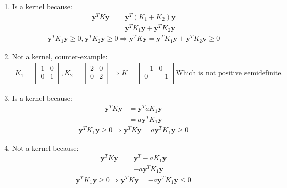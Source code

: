 \begin{answer}
\begin{enumerate}
\item 
Is a kernel because:
\begin{align*}
\textbf{y}^TK\textbf{y}&=\textbf{y}^T(K_1+K_2)\textbf{y}\\
&=\textbf{y}^TK_1\textbf{y}+\textbf{y}^TK_2\textbf{y}
\end{align*}
\begin{align*}
\textbf{y}^TK_1\textbf{y}\geq0,\textbf{y}^TK_2\textbf{y}\geq0\Rightarrow \textbf{y}^TK\textbf{y}=\textbf{y}^TK_1\textbf{y}+\textbf{y}^TK_2\textbf{y}\geq0
\end{align*}
\item 
Not a kernel, counter-example:
\begin{align*}
K_1=
   \begin{bmatrix} 
   1&0\\ 
   0&1\\ 
   \end{bmatrix},
K_2=
   \begin{bmatrix} 
   2&0\\ 
   0&2\\ 
   \end{bmatrix}\Rightarrow
K=
   \begin{bmatrix} 
   -1&0\\ 
   0&-1\\ 
   \end{bmatrix} \text{Which is not positive semidefinite.}
\end{align*}
\item 
Is a kernel because:
\begin{align*}
\textbf{y}^TK\textbf{y}&=\textbf{y}^TaK_1\textbf{y}\\
&=a\textbf{y}^TK_1\textbf{y}
\end{align*}
\begin{align*}
\textbf{y}^TK_1\textbf{y}\geq0\Rightarrow\textbf{y}^TK\textbf{y}=a\textbf{y}^TK_1\textbf{y}\geq0
\end{align*}
\item 
Not a kernel because:
\begin{align*}
\textbf{y}^TK\textbf{y}&=\textbf{y}^T-aK_1\textbf{y}\\
&=-a\textbf{y}^TK_1\textbf{y}
\end{align*}
\begin{align*}
\textbf{y}^TK_1\textbf{y}\geq0\Rightarrow\textbf{y}^TK\textbf{y}=-a\textbf{y}^TK_1\textbf{y}\leq0
\end{align*}

\end{enumerate}
\end{answer}
